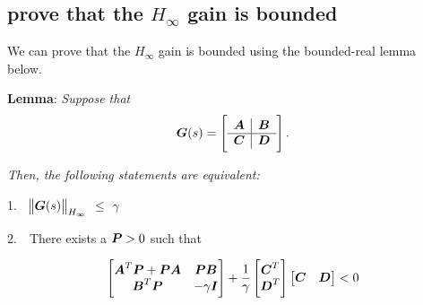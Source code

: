 
\subsection{prove that the ${H_{\infty}}$ gain is bounded}
We can prove that the ${H_{\infty}}$ gain is bounded using the bounded-real lemma~\cite{Boyd1994} below. 

\textbf{Lemma}: \textit{Suppose that}
\begin{equation*}
\boldsymbol{G}(s)=\begin{bmatrix}
\begin{array}{c | c}
\boldsymbol{A}  &  \boldsymbol{B} \\
\hline
\boldsymbol{C}  & \boldsymbol{D}
\end{array}  
\end{bmatrix}.
\end{equation*}

\textit{Then, the following statements are equivalent:} 

1.~~$\norm{\boldsymbol{G}(s)}_{H_{\infty}}$ $\leq$ $\gamma$ \vspace{1mm}
    
2.~~There exists a $\boldsymbol{P} > 0$ such that 

    \begin{equation*}
		\begin{bmatrix}
		\boldsymbol{A}^T\boldsymbol{P}+\boldsymbol{PA} &  \boldsymbol{PB} \\
		\boldsymbol{B}^T\boldsymbol{P}    & -\gamma \boldsymbol{I} \\
		\end{bmatrix}+\dfrac{1}{\gamma}	\begin{bmatrix}
		\boldsymbol{C}^T\\
		\boldsymbol{D}^T\\
		\end{bmatrix}\begin{bmatrix}
		\boldsymbol{C} & \boldsymbol{D}\\
		\end{bmatrix} < 0
		\label{eq-LMI}
		\end{equation*}

